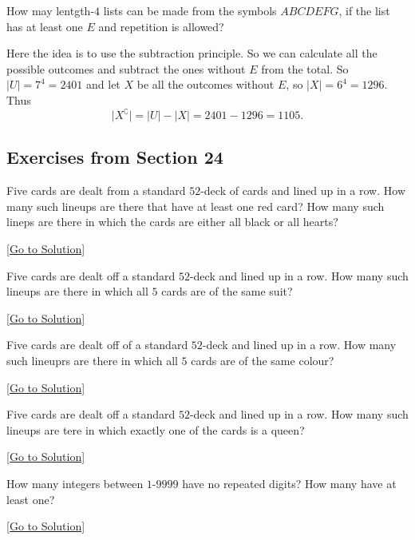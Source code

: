 \begin{example}
    How may lentgth-$4$ lists can be made from the symbols $ABCDEFG$, if the list has at least one $E$ and repetition is allowed? 
    \begin{solution}
        Here the idea is to use the subtraction principle. So we can calculate all the possible outcomes and subtract the ones without $E$ from the total. So $\lvert U \rvert=7^{4}=2401$ and let $X$ be all the outcomes without $E$, so $\lvert X \rvert=6^{4}=1296$. Thus 
        $$
        \lvert X^{\complement} \rvert=\lvert U \rvert-\lvert X \rvert=2401-1296=1105.
        $$
    \end{solution}
\end{example}

\subsection{Exercises from Section 24}
\begin{exercise}\label{ex:2.24.1}
    Five cards are dealt from a standard $52$-deck of cards and lined up in a row. How many such lineups are there that have at least one red card? How many such lineps are there in which the cards are either all black or all hearts? 
\end{exercise}\hyperref[sol:2.24.1]{[Go to Solution]}

\begin{exercise}\label{ex:2.24.2}
    Five cards are dealt off a standard $52$-deck and lined up in a row. How many such lineups are there in which all $5$ cards are of the same suit? 
\end{exercise}\hyperref[sol:2.24.2]{[Go to Solution]}

\begin{exercise}\label{ex:2.24.3}
    Five cards are dealt off of a standard $52$-deck and lined up in a row. How many such lineuprs are there in which all $5$ cards are of the same colour? 
\end{exercise}\hyperref[sol:2.24.3]{[Go to Solution]}

\begin{exercise}\label{ex:2.24.4}
    Five cards are dealt off a standard $52$-deck and lined up in a row. How many such lineups are tere in which exactly one of the cards is a queen? 
\end{exercise}\hyperref[sol:2.24.4]{[Go to Solution]}

\begin{exercise}\label{ex:2.24.5}
    How many integers between $1$-$9999$ have no repeated digits? How many have at least one? 
\end{exercise}\hyperref[sol:2.24.5]{[Go to Solution]}

